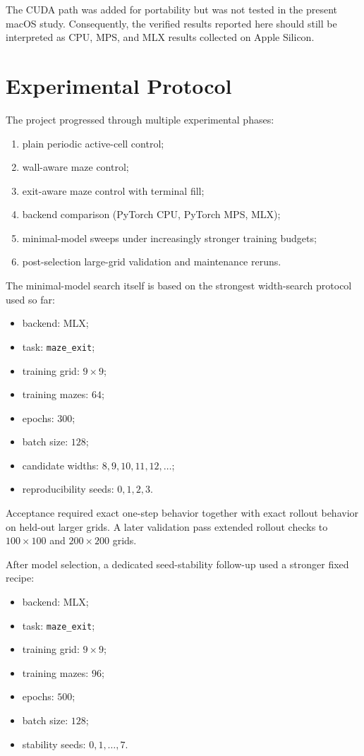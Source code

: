 \documentclass[11pt]{article}
\begin{document}
The CUDA path was added for portability but was not tested in the present macOS study. Consequently, the verified results reported here should still be interpreted as CPU, MPS, and MLX results collected on Apple Silicon.

\section{Experimental Protocol}
The project progressed through multiple experimental phases:
\begin{enumerate}
  \item plain periodic active-cell control;
  \item wall-aware maze control;
  \item exit-aware maze control with terminal fill;
  \item backend comparison (PyTorch CPU, PyTorch MPS, MLX);
  \item minimal-model sweeps under increasingly stronger training budgets;
  \item post-selection large-grid validation and maintenance reruns.
\end{enumerate}

The minimal-model search itself is based on the strongest width-search protocol used so far:
\begin{itemize}
  \item backend: MLX;
  \item task: \texttt{maze\_exit};
  \item training grid: \(9\times 9\);
  \item training mazes: \(64\);
  \item epochs: \(300\);
  \item batch size: \(128\);
  \item candidate widths: \(8, 9, 10, 11, 12,\dots\);
  \item reproducibility seeds: \(0,1,2,3\).
\end{itemize}

Acceptance required exact one-step behavior together with exact rollout behavior on held-out larger grids. A later validation pass extended rollout checks to \(100\times 100\) and \(200\times 200\) grids.

After model selection, a dedicated seed-stability follow-up used a stronger fixed recipe:
\begin{itemize}
  \item backend: MLX;
  \item task: \texttt{maze\_exit};
  \item training grid: \(9\times 9\);
  \item training mazes: \(96\);
  \item epochs: \(500\);
  \item batch size: \(128\);
  \item stability seeds: \(0,1,\dots,7\).
\end{itemize}
\end{document}
